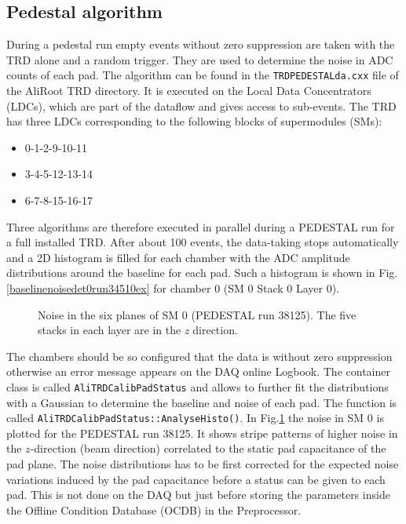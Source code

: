 \documentclass{alicetdr}
\begin{document}
\subsection{Pedestal algorithm}
During a pedestal run empty events without zero suppression are taken 
with the TRD alone and a random trigger. They are used to determine 
the noise in ADC counts of each pad. The algorithm can be found in the 
{\tt TRDPEDESTALda.cxx} file of the AliRoot TRD directory. It is 
executed on the Local Data Concentrators (LDCs), which are part of the 
dataflow and gives access to sub-events. The TRD has three LDCs 
corresponding to the following blocks of supermodules (SMs):
\begin{itemize}
\item 0-1-2-9-10-11
\item 3-4-5-12-13-14
\item 6-7-8-15-16-17
\end{itemize}   
Three algorithms are therefore executed in parallel during a PEDESTAL 
run for a full installed TRD. After about 100 events, the data-taking 
stops automatically and a 2D histogram is filled for each chamber with 
the ADC amplitude distributions around the baseline for each pad. Such 
a histogram is shown in Fig.\ref{baselinenoisedet0run34510ex} for 
chamber 0 (SM 0 Stack 0 Layer 0).
\begin{figure}[h]
  \centering\mbox{}
  \caption{\label{run38125sm0nounfold}Noise in the six planes of 
SM 0 (PEDESTAL run 38125). The five stacks in each layer are in 
the {\it{z}} direction.}
\end{figure}
The chambers should be so configured that the data is without zero 
suppression otherwise an error message appears on the DAQ online 
Logbook. The container class is called {\tt AliTRDCalibPadStatus} 
and allows to further fit the distributions with a Gaussian to 
determine the baseline and noise of each pad. The function is called 
{\tt AliTRDCalibPadStatus::AnalyseHisto()}. In 
Fig.\ref{run38125sm0nounfold} the noise in SM 0 is plotted for the 
PEDESTAL run 38125. It shows stripe patterns of higher noise in the 
$z$-direction (beam direction) correlated to the static pad capacitance 
of the pad plane. The noise distributions has to be first corrected 
for the expected noise variations induced by the pad capacitance 
before a status can be given to each pad. This is not done on the DAQ 
but just before storing the parameters inside the Offline Condition 
Database (OCDB) in the Preprocessor.
\end{document}
